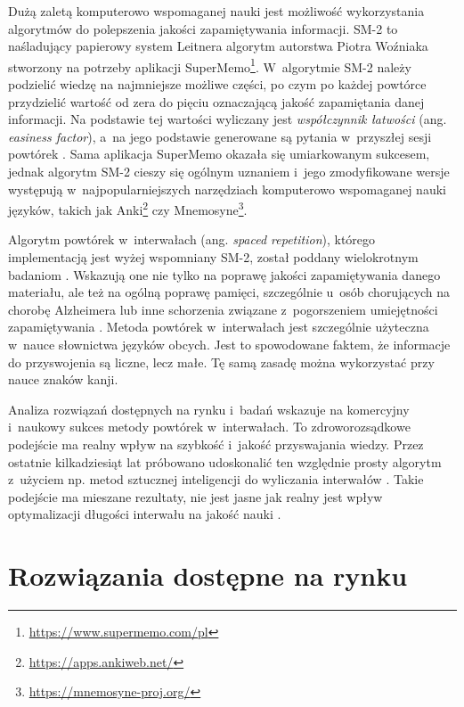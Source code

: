 \documentclass[a4paper,twoside,12pt]{book}
\newcommand{\obcy}[1]{\emph{#1}}
\newcommand{\english}[1]{{\selectlanguage{british}\obcy{#1}}}
\begin{document}
Dużą zaletą komputerowo wspomaganej nauki jest możliwość wykorzystania algorytmów do polepszenia jakości zapamiętywania informacji. SM-2 to naśladujący papierowy system Leitnera algorytm autorstwa Piotra Woźniaka stworzony na potrzeby aplikacji SuperMemo\footnote{\url{https://www.supermemo.com/pl}}. W~algorytmie SM-2 należy podzielić wiedzę na najmniejsze możliwe części, po czym po każdej powtórce przydzielić wartość od zera do pięciu oznaczającą jakość zapamiętania danej informacji. Na podstawie tej wartości wyliczany jest \textit{współczynnik łatwości} (ang. \english{easiness factor}), a~na jego podstawie generowane są pytania w~przyszłej sesji powtórek \cite{bib:wozniak}. Sama aplikacja SuperMemo okazała się umiarkowanym sukcesem, jednak algorytm SM-2 cieszy się ogólnym uznaniem i~jego zmodyfikowane wersje występują w~najpopularniejszych narzędziach komputerowo wspomaganej nauki języków, takich jak Anki\footnote{\url{https://apps.ankiweb.net/}} czy Mnemosyne\footnote{\url{https://mnemosyne-proj.org/}}.

Algorytm powtórek w~interwałach (ang. \english{spaced repetition}), którego implementacją jest wyżej wspomniany SM-2, został poddany wielokrotnym badaniom \cite{bib:artykulAlzheimer,bib:artykulSpaced}. Wskazują one nie tylko na poprawę jakości zapamiętywania danego materiału, ale też na ogólną poprawę pamięci, szczególnie u~osób chorujących na chorobę Alzheimera lub inne schorzenia związane z~pogorszeniem umiejętności zapamiętywania \cite{bib:artykulAlzheimer}. Metoda powtórek w~interwałach jest szczególnie użyteczna w~nauce słownictwa języków obcych. Jest to spowodowane faktem, że informacje do przyswojenia są liczne, lecz małe. Tę samą zasadę można wykorzystać przy nauce znaków kanji. 

Analiza rozwiązań dostępnych na rynku i~badań wskazuje na komercyjny i~naukowy sukces metody powtórek w~interwałach. To zdroworozsądkowe podejście ma realny wpływ na szybkość i~jakość przyswajania wiedzy. Przez ostatnie kilkadziesiąt lat próbowano udoskonalić ten względnie prosty algorytm \cite{bib:spacedRep} z~użyciem np. metod sztucznej inteligencji do wyliczania interwałów \cite{bib:internetNN}. Takie podejście ma mieszane rezultaty, nie jest jasne jak realny jest wpływ optymalizacji długości interwału na jakość nauki \cite[rozdział 6]{bib:ksiazkaEssays}.

\section{Rozwiązania dostępne na rynku}
\end{document}
